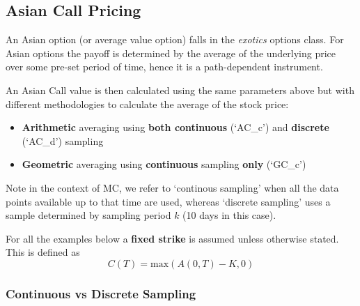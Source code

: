 \documentclass{article}
\providecommand{\tightlist}{%
      \setlength{\itemsep}{0pt}\setlength{\parskip}{0pt}}
\begin{document}
        
    \begin{center}
    \end{center}

    
    \subsection{Asian Call Pricing}\label{asian-call-pricing}

An Asian option (or average value option) falls in the {\it{exotics}} options class. For Asian options the payoff is determined by the average of the underlying price over some pre-set period of time, hence it is a path-dependent instrument.

An Asian Call value is then calculated using the same parameters above
but with different methodologies to calculate the average of the stock
price:

\begin{itemize}
\tightlist
\item
  \textbf{Arithmetic} averaging using \textbf{both continuous} (`AC\_c')
  and \textbf{discrete} (`AC\_d') sampling
\item
  \textbf{Geometric} averaging using \textbf{continuous} sampling
  \textbf{only} (`GC\_c')
\end{itemize}

Note in the context of MC, we refer to `continous sampling' when all the
data points available up to that time are used, whereas `discrete
sampling' uses a sample determined by sampling period $k$ (10 days in
this case).

For all the examples below a \textbf{fixed strike} is assumed unless otherwise stated. This is defined as
\begin{equation}
C(T) = \text{max}\left( A(0,T) - K, 0 \right)
\end{equation}

    \subsubsection{Continuous vs Discrete
Sampling}\label{continuous-vs-discrete-sampling}
\end{document}
